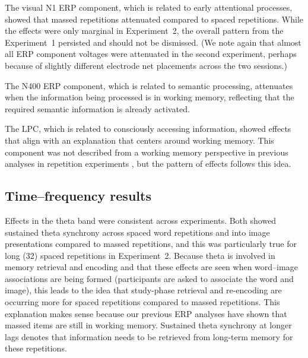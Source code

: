 
The visual N1 ERP component, which is related to early attentional processes, showed that massed repetitions attenuated compared to spaced repetitions.  While the effects were only marginal in Experiment~2, the overall pattern from the Experiment~1 persisted and should not be dismissed. (We note again that almost all ERP component voltages were attenuated in the second experiment, perhaps because of slightly different electrode net placements across the two sessions.)


The N400 ERP component, which is related to semantic processing, attenuates when the information being processed is in working memory, reflecting that the required semantic information is already activated.


The LPC, which is related to consciously accessing information, showed effects that align with an explanation that centers around working memory.  This component was not described from a working memory perspective in previous analyses in repetition experiments \cite[rather, they discussed it as ``template matching'']{OlicEtal2000,VanSEtal2007}, but the pattern of effects follows this idea.


\subsection{Time--frequency results}

Effects in the theta band were consistent across experiments.  Both showed sustained theta synchrony across spaced word repetitions and into image presentations compared to massed repetitions, and this was particularly true for long (32) spaced repetitions in Experiment~2.  Because theta is involved in memory retrieval and encoding and that these effects are seen when word--image associations are being formed (participants are asked to associate the word and image), this leads to the idea that study-phase retrieval and re-encoding are occurring more for spaced repetitions compared to massed repetitions.  This explanation makes sense because our previous ERP analyses have shown that massed items are still in working memory.  Sustained theta synchrony at longer lags denotes that information needs to be retrieved from long-term memory for these repetitions.

